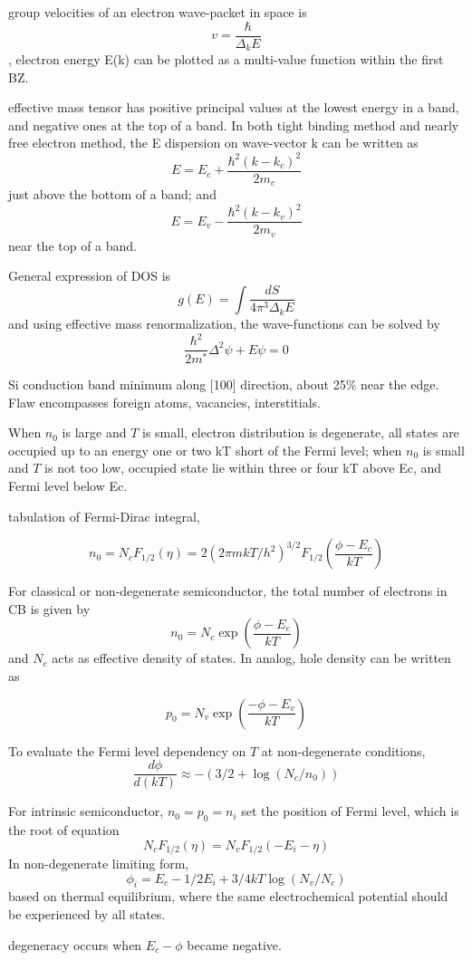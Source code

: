 group velocities of an electron wave-packet in space is 
\[
v = \frac{\hbar}{\Delta_k E}
\]
, electron energy E(k) can be plotted as a multi-value function within the first BZ. 

effective mass tensor has positive principal values at the lowest energy in a band, and negative ones at the top of a band. In both tight binding method and nearly free electron method, the E dispersion on wave-vector k can be written as 
\[
E = E_c + \frac{\hbar^2(k-k_c)^2}{2m_c}
\]
just above the bottom of a band; and 
\[
E = E_v - \frac{\hbar^2(k-k_v)^2}{2m_v}
\]
near the top of a band. 

General expression of DOS is 
\[
g(E) =  \int \frac{dS}{4\pi^3\Delta_kE}
\]
and using effective mass renormalization, the wave-functions can be solved by
\[
\frac{\hbar^2}{2m^*} \Delta^2\psi + E\psi = 0
\]

Si conduction band minimum along [100] direction, about 25\% near the edge. Flaw encompasses foreign atoms, vacancies, interstitials. 

When $n_0$ is large and $T$ is small, electron distribution is degenerate, all states are occupied up to an energy one or two kT short of the Fermi level; when $n_0$ is small and $T$ is not too low, occupied state lie within three or four kT above Ec, and Fermi level below Ec. 

tabulation of Fermi-Dirac integral, 

\[
n_0 = N_c F_{1/2}(\eta) = 2(2\pi mkT/h^2)^{3/2}F_{1/2}(\frac{\phi - E_c}{kT})
\]

For classical or non-degenerate semiconductor, the total number of electrons in CB is given by
\[
n_0 = N_c\exp(\frac{\phi - E_c}{kT})
\]
and $N_c$ acts as effective density of states. In analog, hole density can be written as

\[
p_0 = N_v\exp(\frac{-\phi - E_v}{kT})
\]

To evaluate the Fermi level dependency on $T$ at non-degenerate conditions, 
\[
\frac{d\phi}{d(kT)} \approx - (3/2 + \log(N_c/n_0))
\]

For intrinsic semiconductor, $n_0= p_0 = n_i$ set the position of Fermi level, which is the root of equation
\[
 N_c F_{1/2}(\eta) =  N_v F_{1/2}(-E_i - \eta)
\]
In non-degenerate limiting form, 
\[
\phi_i = E_c - 1/2E_i + 3/4kT\log(N_v/N_c)
\]
based on thermal equilibrium, where the same electrochemical potential should be experienced by all states. 

degeneracy occurs when $E_c - \phi$ became negative. 

